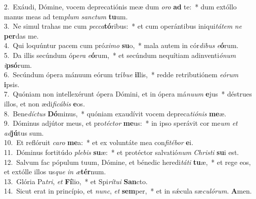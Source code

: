{2.~}Exáudi, Dómine, vocem deprecatiónis meæ dum \textit{o}\textit{ro} \textbf{ad} te:~* dum extóllo manus meas ad tem\textit{plum} \textit{san}\textit{ctum} \textbf{tu}um.\\
{3.~}Ne simul trahas me cum \textit{pec}\textit{ca}\textbf{tó}ribus:~* et cum operántibus iniqui\textit{tá}\textit{tem} \textit{ne} \textbf{per}das me.\\
{4.~}Qui loquúntur pacem cum pró\textit{xi}\textit{mo} \textbf{su}o,~* mala autem in cór\textit{di}\textit{bus} \textit{e}\textbf{ó}rum.\\
{5.~}Da illis secúndum ópe\textit{ra} \textit{e}\textbf{ó}rum,~* et secúndum nequítiam adinventi\textit{ó}\textit{num} \textit{i}\textbf{psó}rum.\\
{6.~}Secúndum ópera mánuum eórum trí\textit{bu}\textit{e} \textbf{il}lis,~* redde retributiónem \textit{e}\textit{ó}\textit{rum} \textbf{i}psis.\\
{7.~}Quóniam non intellexérunt ópera Dómini, et in ópera má\textit{nu}\textit{um} \textbf{e}jus~* déstrues illos, et non ædi\textit{fi}\textit{cá}\textit{bis} \textbf{e}os.\\
{8.~}Bene\textit{dí}\textit{ctus} \textbf{Dó}minus,~* quóniam exaudívit vocem depreca\textit{ti}\textit{ó}\textit{nis} \textbf{me}æ.\\
{9.~}Dóminus adjútor meus, et pro\textit{té}\textit{ctor} \textbf{me}us:~* in ipso sperávit cor me\textit{um} \textit{et} \textit{ad}\textbf{jú}tus sum.\\
{10.~}Et reflóruit \textit{ca}\textit{ro} \textbf{me}a:~* et ex voluntáte mea con\textit{fi}\textit{té}\textit{bor} \textbf{e}i.\\
{11.~}Dóminus fortitúdo \textit{ple}\textit{bis} \textbf{su}æ:~* et protéctor salvatió\textit{num} \textit{Chri}\textit{sti} \textbf{su}i est.\\
{12.~}Salvum fac pópulum tuum, Dómine, et bénedic heredi\textit{tá}\textit{ti} \textbf{tu}æ,~* et rege eos, et extólle illos us\textit{que} \textit{in} \textit{æ}\textbf{tér}num.\\
{13.~}Glória Pa\textit{tri}, \textit{et} \textbf{Fí}lio,~* et Spi\textit{rí}\textit{tu}\textit{i} \textbf{San}cto.\\
{14.~}Sicut erat in princípio, et \textit{nunc}, \textit{et} \textbf{sem}per,~* et in sǽcula sæ\textit{cu}\textit{ló}\textit{rum}. \textbf{A}men.\\
